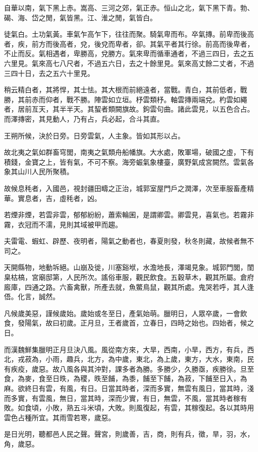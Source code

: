 自華以南，氣下黑上赤。嵩高、三河之郊，氣正赤。恒山之北，氣下黑下青。勃、碣、海、岱之閒，氣皆黑。江、淮之閒，氣皆白。

徒氣白。土功氣黃。車氣乍高乍下，往往而聚。騎氣卑而布。卒氣摶。前卑而後高者，疾，前方而後高者，兌，後兌而卑者，卻。其氣平者其行徐。前高而後卑者，不止而反。氣相遇者，卑勝高，兌勝方。氣來卑而循車通者，不過三四日，去之五六里見。氣來高七八尺者，不過五六日，去之十餘里見。氣來高丈餘二丈者，不過三四十日，去之五六十里見。

稍云精白者，其將悍，其士怯。其大根而前絕遠者，當戰。青白，其前低者，戰勝，其前赤而仰者，戰不勝。陣雲如立垣。杼雲類杼。軸雲摶兩端兌。杓雲如繩者，居前亙天，其半半天。其蛪者類闕旗故。鉤雲句曲。諸此雲見，以五色合占。而澤摶密，其見動人，乃有占，兵必起，合斗其直。

王朔所候，決於日旁。日旁雲氣，人主象。皆如其形以占。

故北夷之氣如群畜穹閭，南夷之氣類舟船幡旗。大水處，敗軍場，破國之虛，下有積錢，金寶之上，皆有氣，不可不察。海旁蜄氣象樓臺，廣野氣成宮闕然。雲氣各象其山川人民所聚積。

故候息秏者，入國邑，視封疆田疇之正治，城郭室屋門戶之潤澤，次至車服畜產精華。實息者，吉，虛秏者，凶。

若煙非煙，若雲非雲，郁郁紛紛，蕭索輪囷，是謂卿雲。卿雲見，喜氣也。若霧非霧，衣冠而不濡，見則其域被甲而趨。

夫雷電、蝦虹、辟歷、夜明者，陽氣之動者也，春夏則發，秋冬則藏，故候者無不司之。

天開縣物，地動坼絕。山崩及徙，川塞谿垘，水澹地長，澤竭見象。城郭門閭，閨臬枯槁，宮廟邸第，人民所次。謠俗車服，觀民飲食。五穀草木，觀其所屬。倉府廄庫，四通之路。六畜禽獸，所產去就，魚鱉鳥鼠，觀其所處。鬼哭若呼，其人逢俉。化言，誠然。

凡候歲美惡，謹候歲始。歲始或冬至日，產氣始萌。臘明日，人眾卒歲，一會飲食，發陽氣，故曰初歲。正月旦，王者歲首，立春日，四時之始也。四始者，候之日。

而漢魏鮮集臘明正月旦決八風。風從南方來，大旱，西南，小旱，西方，有兵，西北，戎菽為，小雨，趣兵，北方，為中歲，東北，為上歲，東方，大水，東南，民有疾疫，歲惡。故八風各與其沖對，課多者為勝。多勝少，久勝亟，疾勝徐。旦至食，為麥，食至日昳，為稷，昳至餔，為黍，餔至下餔，為菽，下餔至日入，為麻。欲終日有雲，有風，有日。日當其時者，深而多實，無雲有風日，當其時，淺而多實，有雲風，無日，當其時，深而少實，有日，無雲，不風，當其時者稼有敗。如食頃，小敗，熟五斗米頃，大敗。則風復起，有雲，其稼復起。各以其時用雲色占種所宜。其雨雪若寒，歲惡。

是日光明，聽都邑人民之聲。聲宮，則歲善，吉，商，則有兵，徵，旱，羽，水，角，歲惡。

